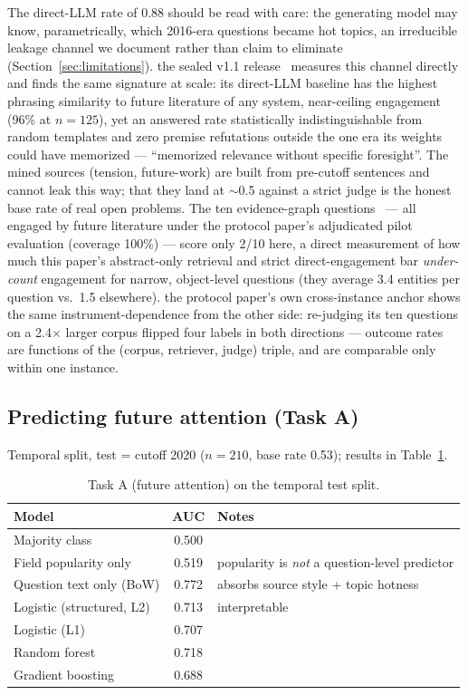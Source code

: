 \documentclass[11pt]{article}
\begin{document}
The direct-LLM rate of 0.88 should be read with care: the generating model
may know, parametrically, which 2016-era questions became hot topics, an
irreducible leakage channel we document rather than claim to eliminate
(Section~\ref{sec:limitations}). the sealed v1.1 release~\cite{paper2} measures this channel
directly and finds the same signature at scale: its direct-LLM baseline
has the highest phrasing similarity to future literature of any system,
near-ceiling engagement (96\% at $n=125$), yet an answered rate
statistically indistinguishable from random templates and zero premise
refutations outside the one era its weights could have memorized ---
``memorized relevance without specific foresight''. The mined sources
(tension, future-work) are built from pre-cutoff sentences and cannot
leak this way; that they land at $\sim$0.5 against a strict judge is
the honest base rate of real open problems. The ten evidence-graph questions~\cite{paper1}
--- all engaged by future literature under the protocol paper's adjudicated pilot
evaluation (coverage 100\%) --- score only 2/10 here, a direct
measurement of how much this paper's abstract-only retrieval and strict
direct-engagement bar \emph{under-count} engagement for narrow,
object-level questions (they average 3.4 entities per question vs.\ 1.5
elsewhere). the protocol paper's own cross-instance anchor shows the same
instrument-dependence from the other side: re-judging its ten questions
on a 2.4$\times$ larger corpus flipped four labels in both directions
--- outcome rates are functions of the (corpus, retriever, judge)
triple, and are comparable only within one instance.

\subsection{Predicting future attention (Task A)}

Temporal split, test = cutoff 2020 ($n=210$, base rate 0.53); results in
Table~\ref{tab:models}.

\begin{table}[htbp]
  \centering
  \caption{Task A (future attention) on the temporal test split.}
  \label{tab:models}
  \begin{tabular}{lcl}
    \toprule
    Model & AUC & Notes \\
    \midrule
    Majority class            & 0.500 & \\
    Field popularity only     & 0.519 & popularity is \emph{not} a question-level predictor \\
    Question text only (BoW)  & 0.772 & absorbs source style + topic hotness \\
    Logistic (structured, L2) & 0.713 & interpretable \\
    Logistic (L1)             & 0.707 & \\
    Random forest             & 0.718 & \\
    Gradient boosting         & 0.688 & \\
    \bottomrule
  \end{tabular}
\end{table}
\end{document}
